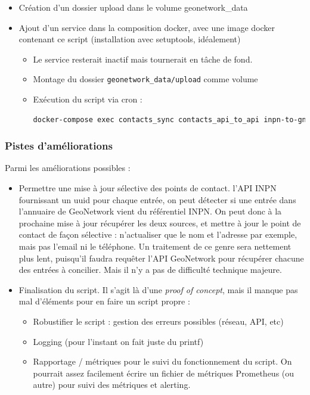 \documentclass[11pt, a4paper, oneside]{book}
\newcommand{\gn}{GeoNetwork\xspace}
\begin{document}
\begin{itemize}
	\item Création d'un dossier upload dans le volume geonetwork\_data
	\item Ajout d'un service dans la composition docker, avec une image docker contenant ce script (installation avec setuptools, idéalement)
	\begin{itemize}
		\item Le service resterait inactif mais tournerait en tâche de fond.
		\item Montage du dossier \lstinline{geonetwork_data/upload} comme volume
		\item Exécution du script via cron : 
		
		\begin{lstlisting}[language=bash]
		docker-compose exec contacts_sync contacts_api_to_api inpn-to-gn les_options_du_script
		\end{lstlisting}
		
	\end{itemize} 
\end{itemize}


\subsubsection*{Pistes d'améliorations}
Parmi les améliorations possibles : 

\begin{itemize}
	\item Permettre une mise à jour sélective des points de contact. l'API INPN fournissant un uuid pour chaque entrée, on peut détecter si une entrée dans l'annuaire de \gn vient du référentiel INPN. On peut donc à la prochaine mise à jour récupérer les deux sources, et mettre à jour le point de contact de façon sélective : n'actualiser que le nom et l'adresse par exemple, mais pas l'email ni le téléphone. Un traitement de ce genre sera nettement plus lent, puisqu'il faudra requêter l'API \gn pour récupérer chacune des entrées à concilier. Mais il n'y a pas de difficulté technique majeure.
	\item Finalisation du script. Il s'agit là d'une \textit{proof of concept}, mais il manque pas mal d'éléments pour en faire un script propre : 
	\begin{itemize}
		\item Robustifier le script : gestion des erreurs possibles (réseau, API, etc)
		\item Logging (pour l'instant on fait juste du printf)
		\item Rapportage / métriques pour le suivi du fonctionnement du script. On pourrait assez facilement écrire un fichier de métriques Prometheus (ou autre) pour suivi des métriques et alerting.
	\end{itemize} 
\end{itemize}
\end{document}
